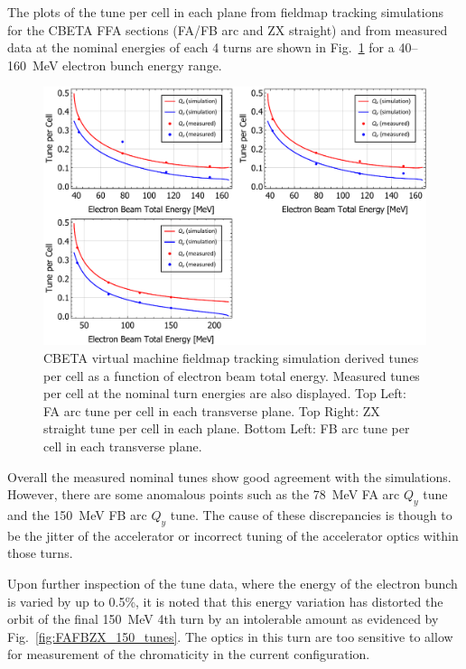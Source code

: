 \documentclass[../main.tex]{subfiles}
\begin{document}
The plots of the tune per cell in each plane from fieldmap tracking simulations for the CBETA FFA sections (FA/FB arc and ZX straight) and from measured data at the nominal energies of each 4 turns are shown in Fig.~\ref{fig:fieldmap_chromaticity_tune} for a 40--160~\si{\mega\electronvolt} electron bunch energy range.
\begin{figure}[!h]
\centering
\includegraphics[width=\textwidth]{Figures/CBETA_Multi-Pass_Commissioning/chromaticity/FAFBZX_nominal_tunes.pdf}
\caption{CBETA virtual machine fieldmap tracking simulation derived tunes per cell as a function of electron beam total energy. Measured tunes per cell at the nominal turn energies are also displayed. Top Left: FA arc tune per cell in each transverse plane. Top Right: ZX straight tune per cell in each plane. Bottom Left: FB arc tune per cell in each transverse plane. }
\label{fig:fieldmap_chromaticity_tune}
\end{figure}

Overall the measured nominal tunes show good agreement with the simulations. However, there are some anomalous points such as the 78~\si{\mega\electronvolt} FA arc $Q_{y}$ tune and the 150~\si{\mega\electronvolt} FB arc $Q_{y}$ tune. The cause of these discrepancies is though to be the jitter of the accelerator or incorrect tuning of the accelerator optics within those turns.

Upon further inspection of the tune data, where the energy of the electron bunch is varied by up to 0.5\%, it is noted that this energy variation has distorted the orbit of the final 150~\si{\mega\electronvolt} 4th turn by an intolerable amount as evidenced by Fig.~\ref{fig:FAFBZX_150_tunes}. The optics in this turn are too sensitive to allow for measurement of the chromaticity in the current configuration.
\end{document}
